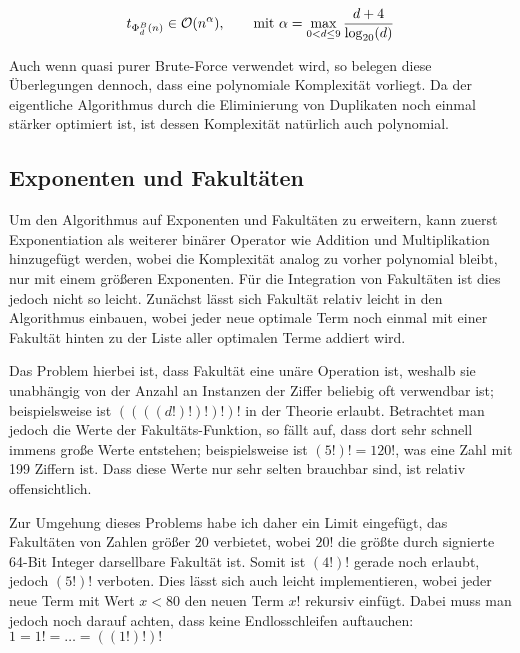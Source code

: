 \documentclass{article}
\theoremstyle{nonumberplain}
\begin{document}
\[t_{\Phi_{d}^{B}(n)} \in \mathcal{O}(n^{\alpha}),\qquad\text{mit }\alpha=\max_{0 < d \leq 9}\frac{d+4}{\log_{20}(d)}\]

Auch wenn quasi purer Brute-Force verwendet wird, so belegen diese Überlegungen dennoch, dass eine polynomiale Komplexität vorliegt.
Da der eigentliche Algorithmus durch die Eliminierung von Duplikaten noch einmal stärker optimiert ist, ist dessen Komplexität natürlich auch polynomial.

\subsection{Exponenten und Fakultäten}

Um den Algorithmus auf Exponenten und Fakultäten zu erweitern, kann zuerst Exponentiation als weiterer binärer Operator wie Addition und Multiplikation hinzugefügt werden, wobei die Komplexität analog zu vorher polynomial bleibt, nur mit einem größeren Exponenten.
Für die Integration von Fakultäten ist dies jedoch nicht so leicht.
Zunächst lässt sich Fakultät relativ leicht in den Algorithmus einbauen, wobei jeder neue optimale Term noch einmal mit einer Fakultät hinten zu der Liste aller optimalen Terme addiert wird.

Das Problem hierbei ist, dass Fakultät eine unäre Operation ist, weshalb sie unabhängig von der Anzahl an Instanzen der Ziffer beliebig oft verwendbar ist; beispielsweise ist \(((((d!)!)!)!)!\) in der Theorie erlaubt.
Betrachtet man jedoch die Werte der Fakultäts-Funktion, so fällt auf, dass dort sehr schnell immens große Werte entstehen; beispielsweise ist \((5!)!=120!\), was eine Zahl mit 199 Ziffern ist.
Dass diese Werte nur sehr selten brauchbar sind, ist relativ offensichtlich.

Zur Umgehung dieses Problems habe ich daher ein Limit eingefügt, das Fakultäten von Zahlen größer \(20\) verbietet, wobei \(20!\) die größte durch signierte 64-Bit Integer darsellbare Fakultät ist.
Somit ist \((4!)!\) gerade noch erlaubt, jedoch \((5!)!\) verboten.
Dies lässt sich auch leicht implementieren, wobei jeder neue Term mit Wert \(x < 80\) den neuen Term \(x!\) rekursiv einfügt.
Dabei muss man jedoch noch darauf achten, dass keine Endlosschleifen auftauchen: \(1 = 1! = \ldots = ((1!)!)!\)
\end{document}

